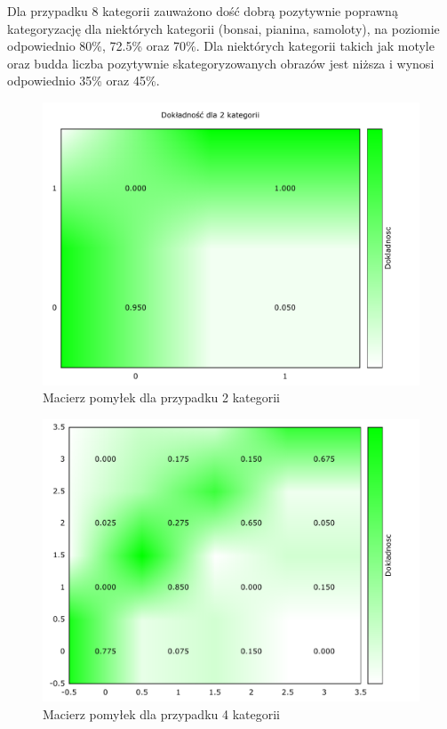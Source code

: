 Dla przypadku 8 kategorii zauważono dość dobrą pozytywnie poprawną kategoryzację dla niektórych kategorii (bonsai, pianina, samoloty), na poziomie odpowiednio 80\%, 72.5\% oraz 70\%. Dla niektórych kategorii takich jak motyle oraz budda liczba pozytywnie skategoryzowanych obrazów jest niższa i wynosi odpowiednio 35\% oraz 45\%.

\begin{figure}[h]
	\centering
	\includegraphics[scale=1.1]{graphics/04_interpretacja_wynikow/confusion-matrix-2.pdf}
	\caption{ Macierz pomyłek dla przypadku 2 kategorii }
	\label{fig:confusion-matrix-2}
\end{figure}

\begin{figure}[h]
	\centering
	\includegraphics[scale=1.1]{graphics/04_interpretacja_wynikow/confusion-matrix-4.pdf}
	\caption{ Macierz pomyłek dla przypadku 4 kategorii }
	\label{fig:confusion-matrix-4}
\end{figure}

